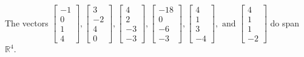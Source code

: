 \begin{exercise}
\begin{exerciseStatement}
  \end{exerciseStatement}
  \begin{exerciseAnswer}
   The vectors \(\left[\begin{array}{r}
-1 \\
0 \\
1 \\
4
\end{array}\right] , \left[\begin{array}{r}
3 \\
-2 \\
4 \\
0
\end{array}\right] , \left[\begin{array}{r}
4 \\
2 \\
-3 \\
-3
\end{array}\right] , \left[\begin{array}{r}
-18 \\
0 \\
-6 \\
-3
\end{array}\right] , \left[\begin{array}{r}
4 \\
1 \\
3 \\
-4
\end{array}\right] , \text{ and } \left[\begin{array}{r}
4 \\
1 \\
1 \\
-2
\end{array}\right]\) 
  	 do  
	span \(\mathbb{R}^4\).
  


  \end{exerciseAnswer}
\end{exercise}